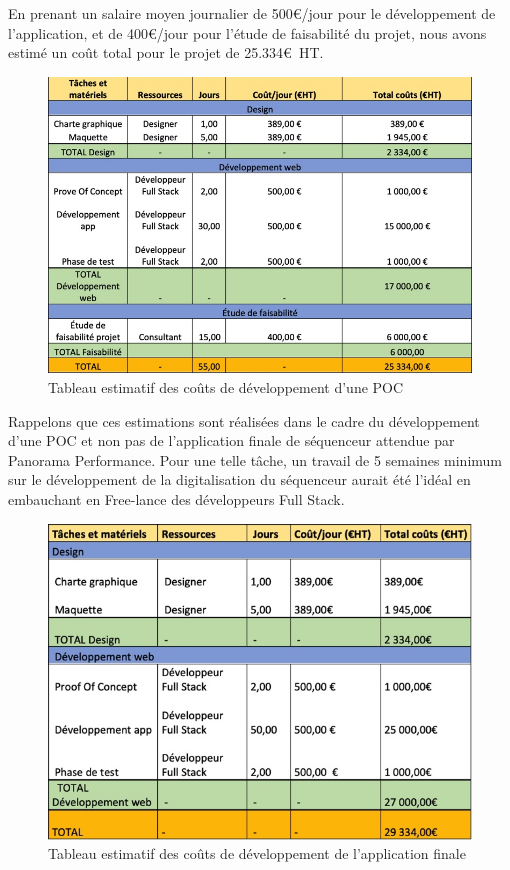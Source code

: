 En prenant un salaire moyen journalier de 500\euro/jour pour le développement de l'application, et de 400\euro/jour pour l'étude de faisabilité du projet, nous avons estimé un coût total pour le projet de 25.334\euro~HT.
\clearpage

\begin{figure}[!h]
    \centering
    \includegraphics[scale=0.5]{img/estimation_prix_poc.jpeg}
    \caption{Tableau estimatif des coûts de développement d'une POC}
    \label{fig:TabEstimationPOC}
\end{figure}

Rappelons que ces estimations sont réalisées dans le cadre du développement d'une POC et non pas de l'application finale de séquenceur attendue par Panorama Performance. Pour une telle tâche, un travail de 5 semaines minimum sur le développement de la digitalisation du séquenceur aurait été l’idéal en embauchant en Free-lance des développeurs Full Stack. 


\begin{figure}[!h]
    \centering
    \includegraphics[scale=0.5]{img/estimation_prix_projetFL.jpeg}
    \caption{Tableau estimatif des coûts de développement de l'application finale}
    \label{fig:TabEstimationAppFL}
\end{figure}
\clearpage

